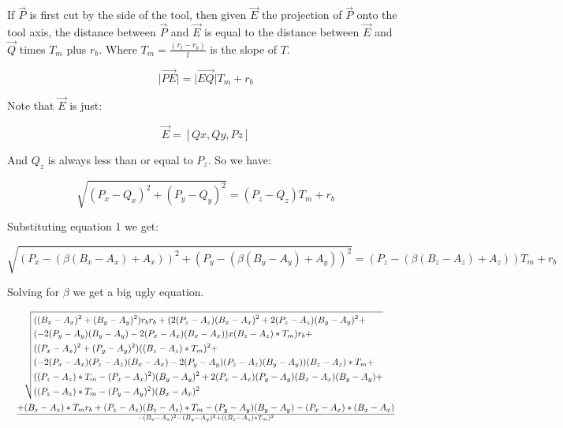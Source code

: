 \documentclass{article}
\newcommand{\norm}[1]{\lvert #1 \rvert}
\begin{document}
If $\vec{P}$ is first cut by the side of the tool, then given $\vec{E}$ the
projection of $\vec{P}$ onto the tool axis, the distance between $\vec{P}$ and
$\vec{E}$ is equal to the distance between $\vec{E}$ and $\vec{Q}$ times $T_m$
plus $r_b$.  Where $T_m=\frac{(r_t - r_b)}{l}$ is the slope of $T$.

\begin{equation*}
\norm{\vec{PE}} = \norm{\vec{EQ}} T_m + r_b
\end{equation*}

Note that $\vec{E}$ is just:

\begin{equation*}
\vec{E} = [Qx, Qy, Pz]
\end{equation*}

And $Q_z$ is always less than or equal to $P_z$.  So we have:

\begin{equation}\label{eq2}
\sqrt{(P_x - Q_x)^2 + (P_y - Q_y)^2} = (P_z - Q_z) T_m + r_b
\end{equation}

Substituting equation 1 we get:

\begin{equation*}
\sqrt{(P_x - (\beta (B_x-A_x) + A_x))^2 + (P_y - (\beta (B_y-A_y) + A_y))^2} =
(P_z - (\beta (B_z - A_z) + A_z)) T_m + r_b
\end{equation*}

Solving for $\beta$ we get a big ugly equation.

\begin{equation*}\resizebox{\hsize}{!}{$
\frac{\begin{aligned}
  & \sqrt{\begin{aligned}
    & ((B_x-A_x)^2 + (B_y-A_y)^2) r_b r_b + (2 (P_z-A_z) (B_x-A_x)^2 + 2 (P_z-A_z)
    (B_y-A_y)^2 + \\ & (-2 (P_y-A_y) (B_y-A_y) - 2 (P_x-A_x) (B_x-A_x)) x
    (B_z-A_z)*T_m) r_b + \\ & ((P_x-A_x)^2 + (P_y-A_y)^2) ((B_z-A_z)*T_m)^2 + \\
    & (-2 (P_x-A_x) (P_z-A_z) (B_x-A_x) - 2 (P_y-A_y) (P_z-A_z) (B_y-A_y))
    (B_z-A_z)*T_m + \\ & ((P_z-A_z)*T_m - (P_x-A_x)^2) (B_y-A_y)^2 +
    2 (P_x-A_x) (P_y-A_y) (B_x-A_x) (B_y-A_y) + \\
    & ((P_z-A_z)*T_m - (P_y-A_y)^2) (B_x-A_x)^2
    \end{aligned}
  } \\ +
  & (B_z-A_z)*T_m r_b + (P_z-A_z) (B_z-A_z)*T_m - (P_y-A_y) (B_y-A_y) -
  (P_x-A_x) * (B_x-A_x)
  \end{aligned}
}{
  -(B_x-A_x)^2 - (B_y-A_y)^2 + ((B_z-A_z)*T_m)^2
}
$}\end{equation*}
\end{document}

